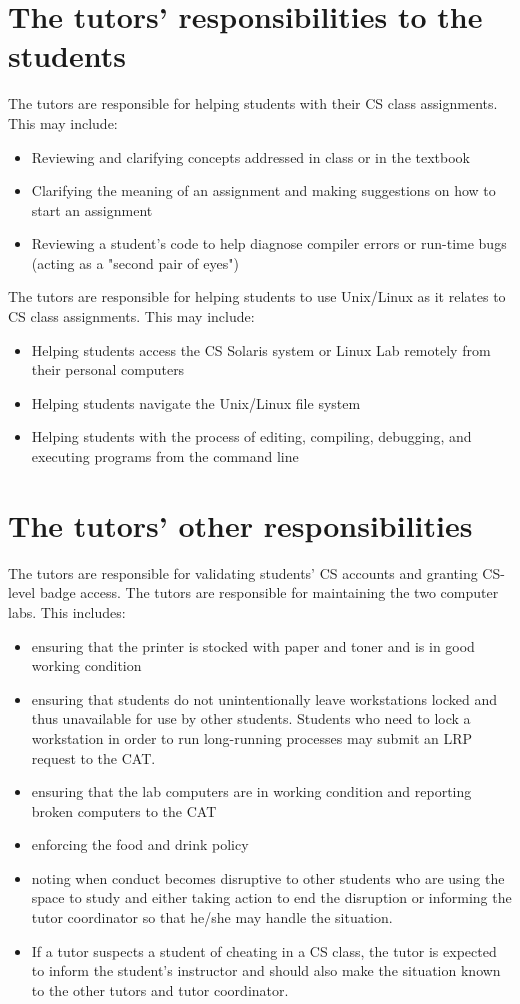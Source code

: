\documentclass[12pt]{article}
\begin{document}
\section{The tutors' responsibilities to the students}
The tutors are responsible for helping students with their CS 
class assignments. This may include:
	\begin{itemize}
	\item Reviewing and clarifying concepts addressed in class or in 
the textbook
	\item Clarifying the meaning of an assignment and making suggestions 
on how to start an assignment
	\item Reviewing a student's code to help diagnose compiler errors or
run-time bugs (acting as a "second pair of eyes")
	\end{itemize}
The tutors are responsible for helping students to use Unix/Linux
as it relates to CS class assignments. This may include:
	\begin{itemize}
	\item Helping students access the CS Solaris system or Linux Lab 
remotely from their personal computers
	\item Helping students navigate the Unix/Linux file system
	\item Helping students with the process of editing, compiling, 
debugging, and executing programs from the command line
	\end{itemize}

\section{The tutors' other responsibilities}
The tutors are responsible for validating students' CS accounts 
and granting CS-level badge access. The tutors are responsible for 
maintaining the two computer labs. This includes:
	\begin{itemize}
	\item ensuring that the printer is stocked with paper and toner and 
is in good working condition
	\item ensuring that students do not unintentionally leave workstations 
locked and thus unavailable for use by other students. Students who need to 
lock a workstation in order to run long-running processes may submit an LRP 
request to the CAT.
	\item ensuring that the lab computers are in working condition and 
reporting broken computers to the CAT
	\item enforcing the food and drink policy
	\item noting when conduct becomes disruptive to other students who are 
using the space to study and either taking action to end the disruption or 
informing the tutor coordinator so that he/she may handle the situation.
	\item If a tutor suspects a student of cheating in a CS class, the 
tutor is expected to inform the student's instructor and should also 
make the situation known to the other tutors and tutor coordinator. 
	\end{itemize}
\end{document}

